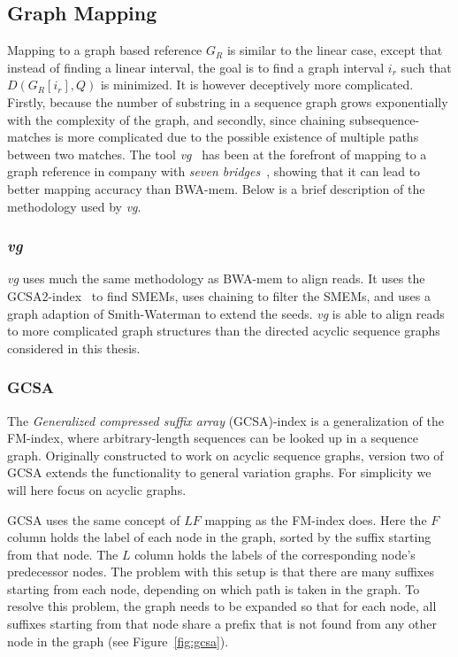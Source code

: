 \subsection{Graph Mapping}
\label{sec:graphmapping}
Mapping to a graph based reference $G_R$ is similar to the linear case, except that instead of finding a linear interval, the goal is to find a graph interval $i_r$ such that $D(G_R[i_r], Q)$ is minimized.
It is however deceptively more complicated. 
Firstly, because the number of substring in a sequence graph grows exponentially with the complexity of the graph, and secondly, since chaining subsequence-matches is more complicated due to the possible existence of multiple paths between two matches.
The tool \emph{vg}~\cite{vg} has been at the forefront of mapping to a graph reference in company with \emph{seven bridges}~\cite{7bridges}, showing that it can lead to better mapping accuracy than BWA-mem.
Below is a brief description of the methodology used by \emph{vg}.

\subsubsection{\emph{vg}}
\emph{vg} uses much the same methodology as BWA-mem to align reads.
It uses the GCSA2-index~\cite{gcsa1, gcsa2} to find SMEMs, uses chaining to filter the SMEMs, and uses a graph adaption of Smith-Waterman to extend the seeds.
\emph{vg} is able to align reads to more complicated graph structures than the directed acyclic sequence graphs considered in this thesis.

\subsubsection{GCSA}
The \emph{Generalized compressed suffix array} (GCSA)-index is a generalization of the FM-index, where arbitrary-length sequences can be looked up in a sequence graph.
Originally constructed to work on acyclic sequence graphs, version two of GCSA extends the functionality to general variation graphs.
For simplicity we will here focus on acyclic graphs.

GCSA uses the same concept of $LF$ mapping as the FM-index does.
Here the $F$ column holds the label of each node in the graph, sorted by the suffix starting from that node.
The $L$ column holds the labels of the corresponding node's predecessor nodes.
The problem with this setup is that there are many suffixes starting from each node, depending on which path is taken in the graph.
To resolve this problem, the graph needs to be expanded so that for each node, all suffixes starting from that node share a prefix that is not found from any other node in the graph (see Figure~\ref{fig:gcsa}).

